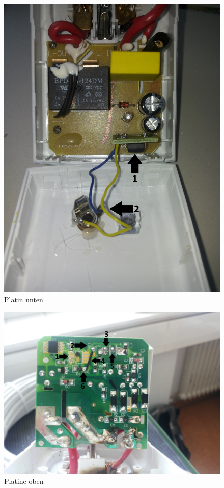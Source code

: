 \begin{figure}[H]
\centering
\includegraphics[keepaspectratio=true, width=13cm]{images/rpi/rpi_platine_top.jpg}
\caption{Platin unten}
\label{fig:report_hardware_plTo}
\end{figure}
\begin{figure}[H]
\centering
\includegraphics[keepaspectratio=true, width=17cm]{images/rpi/rpi_platine_bottom.jpg}
\caption{Platine oben}
\label{fig:report_hardware_plBo}
\end{figure}
